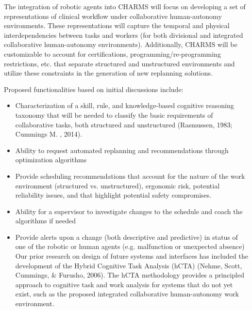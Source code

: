 The integration of robotic agents into CHARMS will focus on developing a set of representations of clinical workflow under collaborative human-autonomy environments. These representations will capture the temporal and physical interdependencies between tasks and workers (for both divisional and integrated collaborative human-autonomy environments). Additionally, CHARMS will be customizable to account for certifications, programming/re-programming restrictions, etc. that separate structured and unstructured environments and utilize these constraints in the generation of new replanning solutions.

Proposed functionalities based on initial discussions include:
\begin{itemize}
\item Characterization of a skill, rule, and knowledge-based cognitive reasoning taxonomy that will be needed to classify the basic requirements of collaborative tasks, both structured and unstructured (Rasmussen, 1983; Cummings M. , 2014).
\item Ability to request automated replanning and recommendations through optimization algorithms
\item Provide scheduling recommendations that account for the nature of the work environment (structured vs. unstructured), ergonomic risk, potential reliability issues, and that highlight potential safety compromises.
\item Ability for a supervisor to investigate changes to the schedule and coach the algorithms if needed
\item Provide alerts upon a change (both descriptive and predictive) in status of one of the robotic or human agents (e.g. malfunction or unexpected absence)
Our prior research on design of future systems and interfaces has included the development of the Hybrid Cognitive Task Analysis (hCTA) (Nehme, Scott, Cummings, \& Furusho, 2006). The hCTA methodology provides a principled approach to cognitive task and work analysis for systems that do not yet exist, such as the proposed integrated collaborative human-autonomy work environment. 
\end{itemize}

